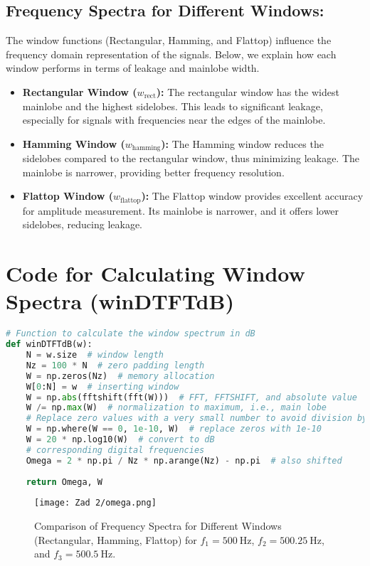 \documentclass[12pt]{article}
\begin{document}
\subsection*{Frequency Spectra for Different Windows:}

The window functions (Rectangular, Hamming, and Flattop) influence the frequency domain representation of the signals. Below, we explain how each window performs in terms of leakage and mainlobe width.

\begin{itemize}
    \item \textbf{Rectangular Window (\(w_{\text{rect}}\)):} The rectangular window has the widest mainlobe and the highest sidelobes. This leads to significant leakage, especially for signals with frequencies near the edges of the mainlobe.
    \item \textbf{Hamming Window (\(w_{\text{hamming}}\)):} The Hamming window reduces the sidelobes compared to the rectangular window, thus minimizing leakage. The mainlobe is narrower, providing better frequency resolution.
    \item \textbf{Flattop Window (\(w_{\text{flattop}}\)):} The Flattop window provides excellent accuracy for amplitude measurement. Its mainlobe is narrower, and it offers lower sidelobes, reducing leakage.
\end{itemize}

\section*{Code for Calculating Window Spectra (winDTFTdB)}
\begin{lstlisting}[language=Python, breaklines=true]
# Function to calculate the window spectrum in dB
def winDTFTdB(w):
    N = w.size  # window length
    Nz = 100 * N  # zero padding length
    W = np.zeros(Nz)  # memory allocation
    W[0:N] = w  # inserting window
    W = np.abs(fftshift(fft(W)))  # FFT, FFTSHIFT, and absolute value
    W /= np.max(W)  # normalization to maximum, i.e., main lobe
    # Replace zero values with a very small number to avoid division by zero
    W = np.where(W == 0, 1e-10, W)  # replace zeros with 1e-10
    W = 20 * np.log10(W)  # convert to dB
    # corresponding digital frequencies
    Omega = 2 * np.pi / Nz * np.arange(Nz) - np.pi  # also shifted
    
    return Omega, W
\end{lstlisting}
\vfill
\begin{figure}[htbp]
\centering
\texttt{[image: Zad 2/omega.png]} 
\caption{Comparison of Frequency Spectra for Different Windows (Rectangular, Hamming, Flattop) for \(f_1 = 500 \ \text{Hz}\), \(f_2 = 500.25 \ \text{Hz}\), and \(f_3 = 500.5 \ \text{Hz}\).}
\label{fig:window_spectra_comparison}
\end{figure}
\end{document}
